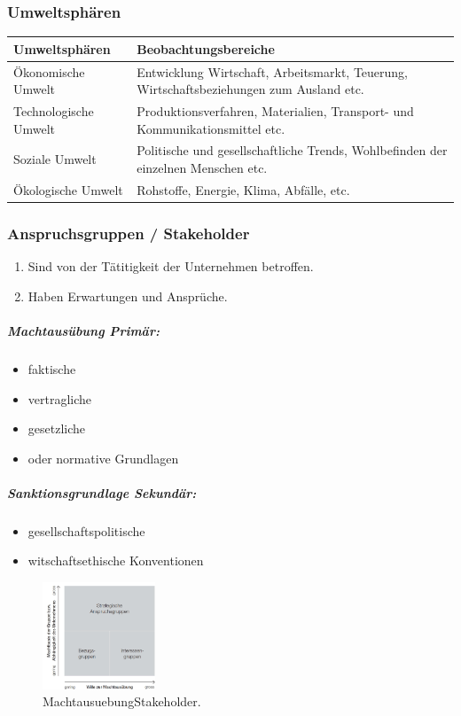 \documentclass{article}
\begin{document}
\subsubsection{Umweltsphären}

\begin{tabular}{|l|l|}
\hline 
\rule[-1ex]{0pt}{2.5ex} \textbf{Umweltsphären} & \textbf{Beobachtungsbereiche} \\ 
\hline 
\rule[-1ex]{0pt}{2.5ex} Ökonomische Umwelt & Entwicklung Wirtschaft, Arbeitsmarkt, Teuerung, Wirtschaftsbeziehungen zum Ausland etc. \\ 
\hline 
\rule[-1ex]{0pt}{2.5ex} Technologische Umwelt & Produktionsverfahren, Materialien, Transport- und Kommunikationsmittel etc. \\ 
\hline 
\rule[-1ex]{0pt}{2.5ex} Soziale Umwelt & Politische und gesellschaftliche Trends, Wohlbefinden der einzelnen Menschen etc. \\ 
\hline 
\rule[-1ex]{0pt}{2.5ex} Ökologische Umwelt & Rohstoffe, Energie, Klima, Abfälle, etc. \\ 
\hline 
\end{tabular} 


\subsubsection{Anspruchsgruppen / Stakeholder}
\begin{enumerate}
\item Sind von der Tätitigkeit der Unternehmen betroffen. 
\item Haben Erwartungen und Ansprüche.
\end{enumerate}
 

\subparagraph{Machtausübung Primär:}
\begin{itemize}
\item faktische
\item vertragliche
\item gesetzliche
\item oder normative Grundlagen
\end{itemize}


\subparagraph{Sanktionsgrundlage Sekundär:}
\begin{itemize}
\item gesellschaftspolitische
\item witschaftsethische Konventionen
\end{itemize}

\begin{figure}[H]
\centering
\includegraphics[width=0.3\textwidth]{Resources/Image/MachtausuebungStakeholder.png}
\caption{\label{fig:MachtausuebungStakeholder}MachtausuebungStakeholder.}
\end{figure}
\end{document}

